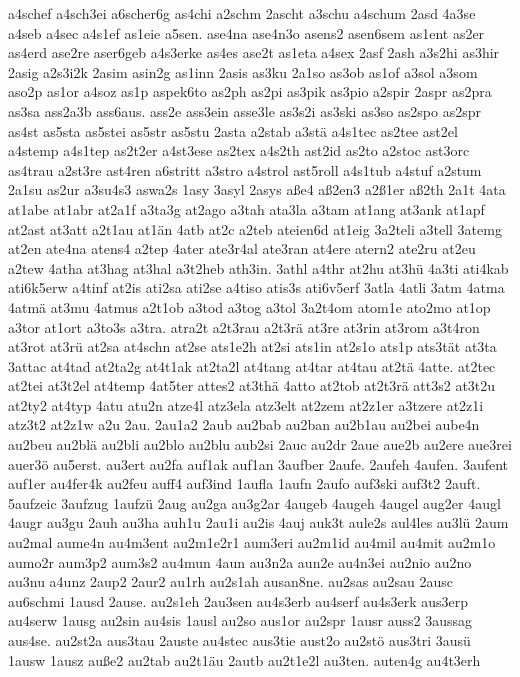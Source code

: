 {a4schef
a4sch3ei
a6scher6g
as4chi
a2schm
2ascht
a3schu
a4schum
2asd
4a3se
a4seb
a4sec
a4s1ef
as1eie
a5sen.
ase4na
ase4n3o
asens2
asen6sem
as1ent
as2er
as4erd
ase2re
aser6geb
a4s3erke
as4es
ase2t
as1eta
a4sex
2asf
2ash
a3s2hi
as3hir
2asig
a2s3i2k
2asim
asin2g
as1inn
2asis
as3ku
2a1so
as3ob
as1of
a3sol
a3som
aso2p
as1or
a4soz
as1p
aspek6to
as2ph
as2pi
as3pik
as3pio
a2spir
2aspr
as2pra
as3sa
ass2a3b
ass6aus.
ass2e
ass3ein
asse3le
as3s2i
as3ski
as3so
as2spo
as2spr
as4st
as5sta
as5stei
as5str
as5stu
2asta
a2stab
a3stä
a4s1tec
as2tee
ast2el
a4stemp
a4s1tep
as2t2er
a4st3ese
as2tex
a4s2th
ast2id
as2to
a2stoc
ast3orc
as4trau
a2st3re
ast4ren
a6stritt
a3stro
a4strol
ast5roll
a4s1tub
a4stuf
a2stum
2a1su
as2ur
a3su4s3
aswa2s
1asy
3asyl
2asys
aße4
aß2en3
a2ß1er
aß2th
2a1t
4ata
at1abe
at1abr
at2a1f
a3ta3g
at2ago
a3tah
ata3la
a3tam
at1ang
at3ank
at1apf
at2ast
at3att
a2t1au
at1än
4atb
at2c
a2teb
ateien6d
at1eig
3a2teli
a3tell
3atemg
at2en
ate4na
atens4
a2tep
4ater
ate3r4al
ate3ran
at4ere
atern2
ate2ru
at2eu
a2tew
4atha
at3hag
at3hal
a3t2heb
ath3in.
3athl
a4thr
at2hu
at3hü
4a3ti
ati4kab
ati6k5erw
a4tinf
at2is
ati2sa
ati2se
a4tiso
atis3s
ati6v5erf
3atla
4atli
3atm
4atma
4atmä
at3mu
4atmus
a2t1ob
a3tod
a3tog
a3tol
3a2t4om
atom1e
ato2mo
at1op
a3tor
at1ort
a3to3s
a3tra.
atra2t
a2t3rau
a2t3rä
at3re
at3rin
at3rom
a3t4ron
at3rot
at3rü
at2sa
at4schn
at2se
ats1e2h
at2si
ats1in
at2s1o
ats1p
ats3tät
at3ta
3attac
at4tad
at2ta2g
at4t1ak
at2ta2l
at4tang
at4tar
at4tau
at2tä
4atte.
at2tec
at2tei
at3t2el
at4temp
4at5ter
attes2
at3thä
4atto
at2tob
at2t3rä
att3s2
at3t2u
at2ty2
at4typ
4atu
atu2n
atze4l
atz3ela
atz3elt
at2zem
at2z1er
a3tzere
at2z1i
atz3t2
at2z1w
a2u
2au.
2au1a2
2aub
au2bab
au2ban
au2b1au
au2bei
aube4n
au2beu
au2blä
au2bli
au2blo
au2blu
aub2si
2auc
au2dr
2aue
aue2b
au2ere
aue3rei
auer3ö
au5erst.
au3ert
au2fa
auf1ak
auf1an
3aufber
2aufe.
2aufeh
4aufen.
3aufent
auf1er
au4fer4k
au2feu
auff4
auf3ind
1aufla
1aufn
2aufo
auf3ski
auf3t2
2auft.
5aufzeic
3aufzug
1aufzü
2aug
au2ga
au3g2ar
4augeb
4augeh
4augel
aug2er
4augl
4augr
au3gu
2auh
au3ha
auh1u
2au1i
au2is
4auj
auk3t
aule2s
aul4les
au3lü
2aum
au2mal
aume4n
au4m3ent
au2m1e2r1
aum3eri
au2m1id
au4mil
au4mit
au2m1o
aumo2r
aum3p2
aum3s2
au4mun
4aun
au3n2a
aun2e
au4n3ei
au2nio
au2no
au3nu
a4unz
2aup2
2aur2
au1rh
au2s1ah
ausan8ne.
au2sas
au2sau
2ausc
au6schmi
1ausd
2ause.
au2s1eh
2au3sen
au4s3erb
au4serf
au4s3erk
aus3erp
au4serw
1ausg
au2sin
au4sis
1ausl
au2so
aus1or
au2spr
1ausr
auss2
3aussag
aus4se.
au2st2a
aus3tau
2auste
au4stec
aus3tie
aust2o
au2stö
aus3tri
3ausü
1ausw
1ausz
auße2
au2tab
au2t1äu
2autb
au2t1e2l
au3ten.
auten4g
au4t3erh
}
